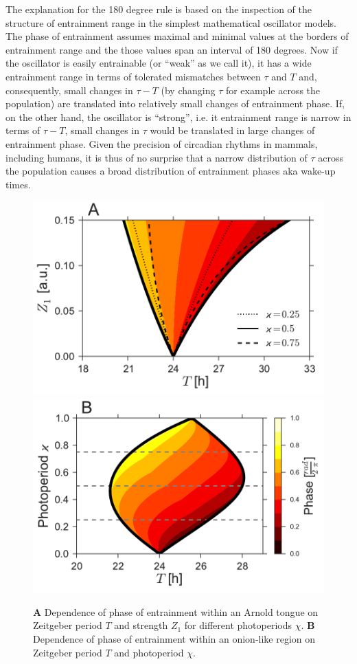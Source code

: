 The explanation for the 180 degree rule is based on the inspection of
the structure of entrainment range in the simplest mathematical
oscillator models.  The phase of entrainment assumes maximal and
minimal values at the borders of entrainment range and the those
values span an interval of 180 degrees. Now if the oscillator is
easily entrainable (or ``weak'' as we call it), it has a wide
entrainment range in terms of tolerated mismatches between $\tau$ and
$T$ and, consequently, small changes in $\tau-T$ (by changing $\tau$
for example across the population) are translated into relatively
small changes of entrainment phase. If, on the other hand, the
oscillator is ``strong'', i.e. it entrainment range is narrow in terms
of $\tau-T$, small changes in $\tau$ would be translated in large
changes of entrainment phase. Given the precision of circadian rhythms
in mammals, including humans, it is thus of no surprise that a narrow
distribution of $\tau$ across the population causes a broad
distribution of entrainment phases aka wake-up times.

\begin{figure}
\begin{center}
\includegraphics[width=0.49\linewidth]{figures/phase/fig1A.pdf}
\includegraphics[width=0.49\linewidth]{figures/phase/fig1B.pdf}
\end{center}
\caption{
  {\bf A} Dependence of phase of entrainment within an Arnold tongue
  on Zeitgeber period $T$ and strength $Z_1$ for different
  photoperiods $\chi$.
  {\bf B} Dependence of phase of entrainment within an onion-like
  region on Zeitgeber period $T$ and photoperiod $\chi$.
\label{fig::phase}
}
\end{figure}

